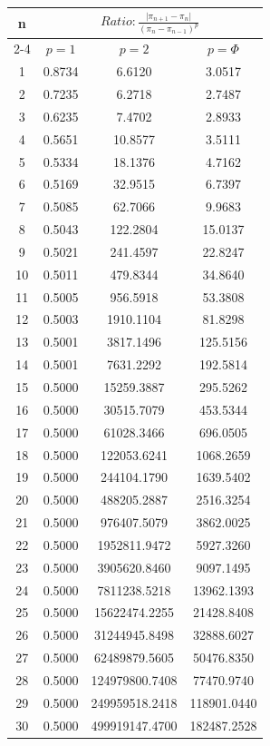 \documentclass{article}
\providecommand{\abs}[1]{\lvert#1\rvert}
\begin{document}
\begin{tabular}{|c|c|c|c|}
\hline
\multirow{2}{*}{n} & \multicolumn{3}{|c|}{$Ratio:\displaystyle\frac{\abs{\pi_{n+1}-\pi_{n}}}{({\pi_{n}-\pi_{n-1}})^p}$} \\
\cline{2-4}
 & $p=1$ & $p=2$ & $p=\Phi$ \\
\hline
 1 & 0.8734 & 6.6120 & 3.0517 \\ 
  2 & 0.7235 & 6.2718 & 2.7487 \\ 
  3 & 0.6235 & 7.4702 & 2.8933 \\ 
  4 & 0.5651 & 10.8577 & 3.5111 \\ 
  5 & 0.5334 & 18.1376 & 4.7162 \\ 
  6 & 0.5169 & 32.9515 & 6.7397 \\ 
  7 & 0.5085 & 62.7066 & 9.9683 \\ 
  8 & 0.5043 & 122.2804 & 15.0137 \\ 
  9 & 0.5021 & 241.4597 & 22.8247 \\ 
 10 & 0.5011 & 479.8344 & 34.8640 \\ 
 11 & 0.5005 & 956.5918 & 53.3808 \\ 
 12 & 0.5003 & 1910.1104 & 81.8298 \\ 
 13 & 0.5001 & 3817.1496 & 125.5156 \\ 
 14 & 0.5001 & 7631.2292 & 192.5814 \\ 
 15 & 0.5000 & 15259.3887 & 295.5262 \\ 
 16 & 0.5000 & 30515.7079 & 453.5344 \\ 
 17 & 0.5000 & 61028.3466 & 696.0505 \\ 
 18 & 0.5000 & 122053.6241 & 1068.2659 \\ 
 19 & 0.5000 & 244104.1790 & 1639.5402 \\ 
 20 & 0.5000 & 488205.2887 & 2516.3254 \\ 
 21 & 0.5000 & 976407.5079 & 3862.0025 \\ 
 22 & 0.5000 & 1952811.9472 & 5927.3260 \\ 
 23 & 0.5000 & 3905620.8460 & 9097.1495 \\ 
 24 & 0.5000 & 7811238.5218 & 13962.1393 \\ 
 25 & 0.5000 & 15622474.2255 & 21428.8408 \\ 
 26 & 0.5000 & 31244945.8498 & 32888.6027 \\ 
 27 & 0.5000 & 62489879.5605 & 50476.8350 \\ 
 28 & 0.5000 & 124979800.7408 & 77470.9740 \\ 
 29 & 0.5000 & 249959518.2418 & 118901.0440 \\ 
 30 & 0.5000 & 499919147.4700 & 182487.2528 \\ 
 \hline 
\end{tabular}
\end{document}
